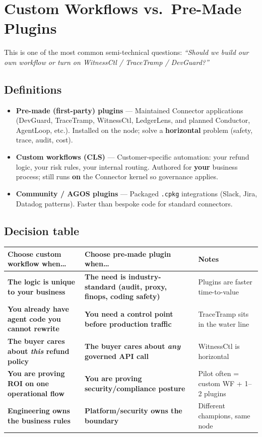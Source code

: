 \chapter{Custom Workflows vs.\ Pre-Made Plugins}

This is one of the most common semi-technical questions: \emph{``Should we build our own workflow or turn on WitnessCtl / TraceTramp / DevGuard?''}

\section{Definitions}

\begin{itemize}
  \item \textbf{Pre-made (first-party) plugins} --- Maintained Connector applications (DevGuard, TraceTramp, WitnessCtl, LedgerLens, and planned Conductor, AgentLoop, etc.). Installed on the node; solve a \textbf{horizontal} problem (safety, trace, audit, cost).
  \item \textbf{Custom workflows (CLS)} --- Customer-specific automation: your refund logic, your risk rules, your internal routing. Authored for \textbf{your} business process; still runs \textbf{on} the Connector kernel so governance applies.
  \item \textbf{Community / AGOS plugins} --- Packaged \texttt{.cpkg} integrations (Slack, Jira, Datadog patterns). Faster than bespoke code for standard connectors.
\end{itemize}

\section{Decision table}

\begin{center}
\renewcommand{\arraystretch}{1.35}
\begin{tabularx}{0.95\textwidth}{@{}>{\bfseries}p{} >{\bfseries}p{} X@{}}
\toprule
\textbf{Choose custom workflow when\ldots} & \textbf{Choose pre-made plugin when\ldots} & \textbf{Notes} \\
\midrule
The logic is unique to your business & The need is industry-standard (audit, proxy, finops, coding safety) & Plugins are faster time-to-value \\
\midrule
You already have agent code you cannot rewrite & You need a control point \textbf{before} production traffic & TraceTramp sits in the water line \\
\midrule
The buyer cares about \emph{this} refund policy & The buyer cares about \emph{any} governed API call & WitnessCtl is horizontal \\
\midrule
You are proving ROI on one operational flow & You are proving security/compliance posture & Pilot often = custom WF + 1--2 plugins \\
\midrule
Engineering owns the business rules & Platform/security owns the boundary & Different champions, same node \\
\bottomrule
\end{tabularx}
\end{center}

